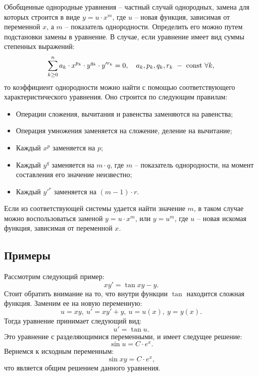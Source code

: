 	Обобщенные однородные уравнения -- частный случай однородных, замена для которых строится в виде $y = u \cdot x^m$, где $u$ -- новая функция, зависимая от переменной $x$, а $m$ -- показатель однородности. Определить его можно путем подстановки замены в уравнение. В случае, если уравнение имеет вид суммы степенных выражений:
	\[ \sum_{k \ge 0}^n a_k \cdot x^{p_k} \cdot y^{q_k} \cdot y'^{r_k} = 0, \quad a_k, p_k, q_k, r_k ~ - ~ \mathrm{const} ~ \forall k, \]
	то коэффициент однородности можно найти с помощью соответствующего характеристического уравнения. Оно строится по следующим правилам:
	\begin{itemize}
		\item Операции сложения, вычитания и равенства заменяются на равенства;
		\item Операция умножения заменяется на сложение, деление на вычитание;
		\item Каждый $x^p$ заменяется на $p$;
		\item Каждый $y^q$ заменяется на $m \cdot q$, где $m$ -- показатель однородности, на момент составления его значение неизвестно;
		\item Каждый $y'^{r}$ заменяется на $(m - 1) \cdot r$.
	\end{itemize}
	Если из соответствующей системы удается найти значение $m$, в таком случае можно воспользоваться заменой $y = u \cdot x^m$, или $y = u^m$, где $u$ -- новая искомая функция, зависимая от переменной $x$.

	\subsection{Примеры}

		Рассмотрим следующий пример:
		\[ xy' = \tan{xy} - y. \]
		Стоит обратить внимание на то, что внутри функции $\tan$ находится сложная функция. Заменим ее на новую переменную:
		\[ u = xy, ~ u' = xy' + y, ~ u = u(x), ~ y = y(x). \]
		Тогда уравнение принимает следующий вид:
		\[ u' = \tan{u}. \]
		Это уравнение с разделяющимися переменными, и имеет следущее решение:
		\[ \sin{u} = C \cdot e^{x}. \]
		Вернемся к исходным переменным:
		\[ \sin{xy} = C \cdot e^{x}, \]
		что является общим решением данного уравнения.

